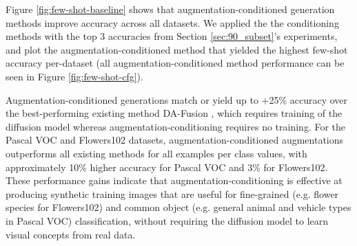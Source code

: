 Figure \ref{fig:few-shot-baseline} shows that augmentation-conditioned generation methods improve accuracy across all datasets. We applied the the conditioning methods with the top 3 accuracies from Section \ref{sec:90_subset}'s experiments, and plot the augmentation-conditioned method that yielded the highest few-shot accuracy per-dataset (all augmentation-conditioned method performance can be seen in Figure \ref{fig:few-shot-cfg}). 

Augmentation-conditioned generations match or yield up to +25\% accuracy over the best-performing existing method DA-Fusion \citep{da-fusion}, which requires training of the diffusion model whereas augmentation-conditioning requires no training. For the Pascal VOC and Flowers102 datasets, augmentation-conditioned augmentations outperforms all existing methods for all examples per class values, with approximately 10\% higher accuracy for Pascal VOC and 3\% for Flowers102. These performance gains indicate that augmentation-conditioning is effective at producing synthetic training images that are useful for fine-grained (e.g. flower species for Flowers102) and common object (e.g. general animal and vehicle types in Pascal VOC) classification, without requiring the diffusion model to learn visual concepts from real data.
